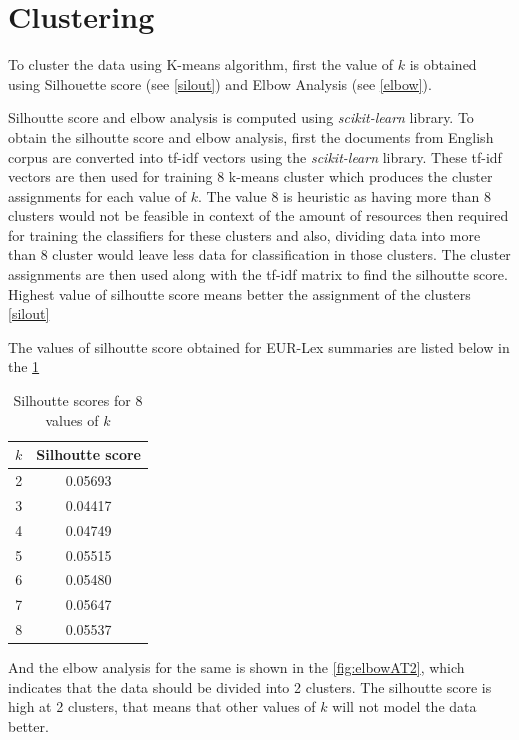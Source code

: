 \fi
\section{Clustering} \label{clustering}

To cluster the data using K-means algorithm, first the value of $k$ is obtained using Silhouette score (see \ref{silout})  and Elbow Analysis (see \ref{elbow}). 

Silhoutte score and elbow analysis is computed using \textit{scikit-learn} library. To obtain the silhoutte score and elbow analysis, first the documents from English corpus are converted into tf-idf vectors using the \textit{scikit-learn} library. These tf-idf vectors are then used for training $8$ k-means cluster which produces the cluster assignments for each value of $k$. The value 8 is heuristic as having more than 8 clusters would not be feasible in context of the amount of resources then required for training the classifiers for these clusters and also, dividing data into more than 8 cluster would leave less data for classification in those clusters. The cluster assignments are then used along with the tf-idf matrix to find the silhoutte score. Highest value of silhoutte score means better the assignment of the clusters \ref{silout}

The values of silhoutte score obtained for EUR-Lex summaries are listed below in the \ref{table:silhoutteScore}
\begin{table}[!ht]
\centering
\begin{tabular}{cc}
\hline
$k$ & Silhoutte score \\ \hline
2 & 0.05693 \\
3 & 0.04417 \\
4 & 0.04749 \\
5 & 0.05515 \\
6 & 0.05480 \\
7 & 0.05647 \\
8 & 0.05537 \\ \hline
\end{tabular}
\caption{Silhoutte scores for 8 values of $k$}
\label{table:silhoutteScore}
\end{table}

And the elbow analysis for the same is shown in the \ref{fig:elbowAT2}, which indicates that the data should be divided into 2 clusters. The silhoutte score is high at 2 clusters, that means that other values of $k$ will not model the data better. 

